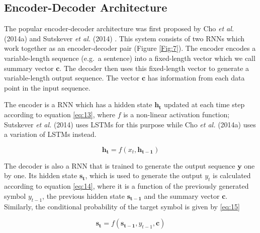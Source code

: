 \subsection{Encoder-Decoder Architecture} 
\label{bg:s4_sub1}

The popular encoder-decoder architecture was first proposed by Cho \textit{et al.} (2014a) \cite{cho2014learning} and Sutskever \textit{et al.} (2014) \cite{sutskever2014sequence}. This system consists of two \ac{RNN}s which work together as an encoder-decoder pair (Figure \ref{Fig:7}). The encoder encodes a variable-length sequence (e.g.\ a sentence) into a fixed-length vector which we call summary vector $ \mathbf{c} $. The decoder then uses this fixed-length vector to generate a variable-length output sequence. The vector $ \mathbf{c} $ has information from each data point in the input sequence.


The encoder is a \ac{RNN} which has a hidden state $\mathbf{h_t}$ updated at each time step according to equation \ref{eq:13}, where $f$ is a non-linear activation function;  Sutskever \textit{et al.} (2014) \cite{sutskever2014sequence} uses \ac{LSTM}s for this purpose while Cho \textit{et al.} (2014a) \cite{cho2014learning} uses a variation of \ac{LSTM}s instead.

\begin{equation}
\label{eq:13}
\mathbf{h_t} = f( x_t, \mathbf{h_{t-1}})
\end{equation}


The decoder is also a \ac{RNN} that is trained to generate the output sequence $ \mathbf{y}$ one by one. 
Its hidden state $ \mathbf{s_t}$, which is used to generate the output  $ y_t$ is calculated according to equation \ref{eq:14}, where it is a function of the previously generated symbol $y_{t-1}$, the previous hidden state $\mathbf{s_{t-1}}$ and the summary vector $\mathbf{c}$. Similarly, the conditional probability of the target symbol is given by \ref{eq:15}

\begin{equation}
\label{eq:14}
\mathbf{s_t} = f(\mathbf{s_{t-1}}, y_{t-1}, \mathbf{c})
\end{equation}

